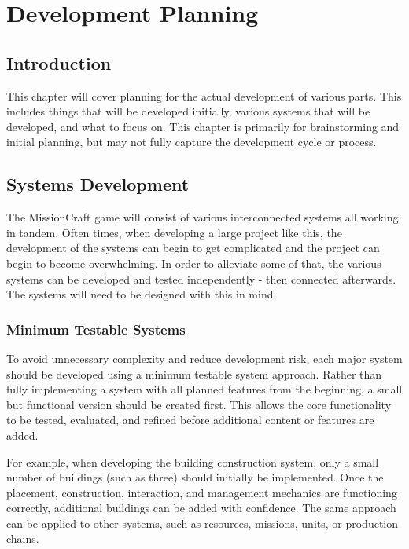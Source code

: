 \chapter{Development Planning}\label{chapter:development_planning}





\section{Introduction}

This chapter will cover planning for the actual development of various parts. This includes things that will be developed initially, various systems that will be developed, and what to focus on. This chapter is primarily for brainstorming and initial planning, but may not fully capture the development cycle or process.






\section{Systems Development}

The MissionCraft game will consist of various interconnected systems all working in tandem. Often times, when developing a large project like this, the development of the systems can begin to get complicated and the project can begin to become overwhelming. In order to alleviate some of that, the various systems can be developed and tested independently - then connected afterwards. The systems will need to be designed with this in mind.

\subsection{Minimum Testable Systems}

To avoid unnecessary complexity and reduce development risk, each major system should be developed using a minimum testable system approach. Rather than fully implementing a system with all planned features from the beginning, a small but functional version should be created first. This allows the core functionality to be tested, evaluated, and refined before additional content or features are added.

For example, when developing the building construction system, only a small number of buildings (such as three) should initially be implemented. Once the placement, construction, interaction, and management mechanics are functioning correctly, additional buildings can be added with confidence. The same approach can be applied to other systems, such as resources, missions, units, or production chains.

